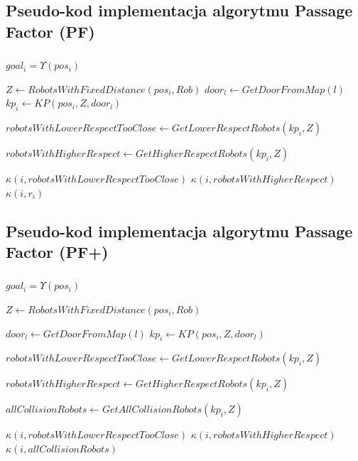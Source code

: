 \documentclass{beamer}
\begin{document}
\subsection*{Pseudo-kod implementacja algorytmu Passage Factor (PF)}
\begin{frame}
\frametitle{\subsecname}
\scriptsize{		
	\begin{algorithmic}[1]
		
		\REPEAT
		
		\STATE $ goal_{i} = \Upsilon(pos_{i}) $
		
		\STATE $ Z \gets RobotsWithFixedDistance(pos_{i},Rob) $
		\STATE $ door_{l} \gets GetDoorFromMap(l) $
		\STATE $ kp_{i} \gets KP(pos_{i}, Z, door_{l}) $
		
		\STATE  $ robotsWithLowerRespectTooClose \gets GetLowerRespectRobots(kp_{i},Z) $
		
		\STATE  $ robotsWithHigherRespect \gets GetHigherRespectRobots(kp_{i},Z) $
		
		\STATE	$ \kappa(i, robotsWithLowerRespectTooClose) $ 
		\ELSE			
		\STATE $ \kappa(i, robotsWithHigherRespect) $
		\ELSE	
		\STATE $ \kappa(i, r_{i}) $ 
		\ENDIF
		\ENDIF
		
\end{algorithmic}}
\end{frame}		


\subsection*{Pseudo-kod implementacja algorytmu  Passage Factor (PF+)}
\begin{frame}
\frametitle{\subsecname}
\scriptsize{		
\begin{algorithmic}[1]
	\REPEAT
	
	\STATE $ goal_{i} = \Upsilon(pos_{i}) $
	
	\STATE $ Z \gets RobotsWithFixedDistance(pos_{i},Rob) $
	
	\STATE $ door_{l} \gets GetDoorFromMap(l) $
	\STATE $ kp_{i} \gets KP(pos_{i}, Z, door_{l}) $
	
	\STATE  $ robotsWithLowerRespectTooClose \gets GetLowerRespectRobots(kp_{i},Z) $
	
	\STATE  $ robotsWithHigherRespect \gets GetHigherRespectRobots(kp_{i},Z) $
	
	\STATE  $ allCollisionRobots \gets GetAllCollisionRobots(kp_{i},Z) $
	
	\STATE	$ \kappa(i, robotsWithLowerRespectTooClose) $ 
	\ELSE			
	\STATE $ \kappa(i, robotsWithHigherRespect) $
	\ELSE	
	\STATE $ \kappa(i, allCollisionRobots) $ 
	\ENDIF
	\ENDIF
	
\end{algorithmic}}
\end{frame}		
\end{document}
